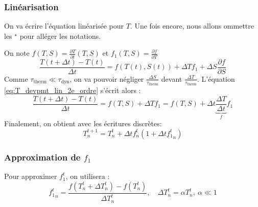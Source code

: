\subsubsection{Linéarisation}
On va écrire l'équation linéarisée pour $T$. Une fois encore, nous allons ommettre les ${}^\star$ pour alléger les notations.

On note $f(T, S) = \frac{\partial T}{\partial t}(T, S)$ et $f_1(T, S) = \frac{\partial f}{\partial T}$
\begin{equation}
  \label{eq:T_devpmt_lin_2e_ordre} 
  \frac{T(t+\Delta t) - T(t)}{\Delta t} = f(T(t), S(t)) + \Delta Tf_1 + \Delta S\frac{\partial f}{\partial S}
\end{equation}
Comme $\tau_\textrm{therm} \ll \tau_\textrm{dyn}$, on va pouvoir négliger $\frac{\Delta S}{\tau_\textrm{therm}}$ devant $\frac{\Delta T}{\tau_\textrm{therm}}$. L'équation \eqref{eq:T_devpmt_lin_2e_ordre} s'écrit alors :
\begin{equation}
  \frac{T(t+\Delta t) - T(t)}{\Delta t} = f(T, S) + \Delta T f_1 = f(T, S) + \Delta t \underbrace{\frac{\Delta T}{\Delta t}}_{f} f_1
\end{equation}
Finalement, on obtient avec les écritures discrètes:
\begin{equation}
  T^{t+1}_n = T^{t}_n + \Delta t f^t_n \left(1 + \Delta t {f_1^t}_n\right)
\end{equation}

\subsubsection{Approximation de $f_1$}
Pour approximer $f_1^t$, on utilisera :
\begin{equation}
  {f_1^t}_n = \frac{f(T_n^t+\Delta T_n^t) - f(T_n^t)}{\Delta T_n^t}, \quad \Delta T_n^t = \alpha T_n^t,\ \alpha \ll 1
\end{equation}
